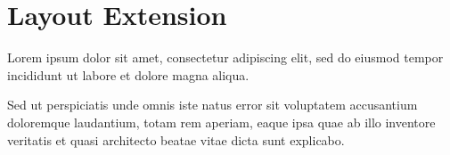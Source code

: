 
\chapter{\label{layout-extension}Layout Extension}
\begin{minipage}[t]{0.6466666666666666\textwidth}

\par Lorem ipsum dolor sit amet, consectetur adipiscing elit, sed do eiusmod tempor incididunt ut labore et dolore magna aliqua.
\end{minipage}
\hfill
\begin{minipage}[t]{0.3133333333333333\textwidth}

\par Sed ut perspiciatis unde omnis iste natus error sit voluptatem accusantium doloremque laudantium, totam rem aperiam, eaque ipsa quae ab illo inventore veritatis et quasi architecto beatae vitae dicta sunt explicabo.
\end{minipage}
